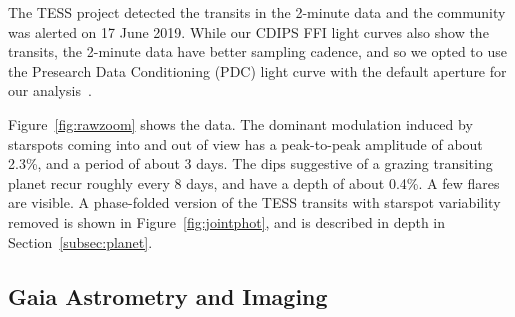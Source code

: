 \documentclass[12pt,twocolumn,tighten]{aastex62}
\begin{document}
The TESS project detected the transits in the 2-minute data and the
community was alerted on 17 June 2019.  While our CDIPS FFI light
curves also show the transits, the 2-minute data have better sampling
cadence, and so we opted to use the Presearch Data Conditioning (PDC)
light curve with the default aperture for our
analysis~\citep{smith_kepler_2012,stumpe_multiscale_2014,jenkins_tess_2016,smith_finding_2016}.

Figure~\ref{fig:rawzoom} shows the data.  The dominant modulation
induced by starspots coming into and out of view has a peak-to-peak
amplitude of about 2.3\%, and a period of about 3 days.  The dips
suggestive of a grazing transiting planet recur roughly every 8 days,
and have a depth of about 0.4\%.  A few flares are visible.  A
phase-folded version of the TESS transits with starspot variability
removed is shown in Figure~\ref{fig:jointphot}, and is described in
depth in Section~\ref{subsec:planet}.


\subsection{Gaia Astrometry and Imaging}
\label{subsec:gaia}
\end{document}
